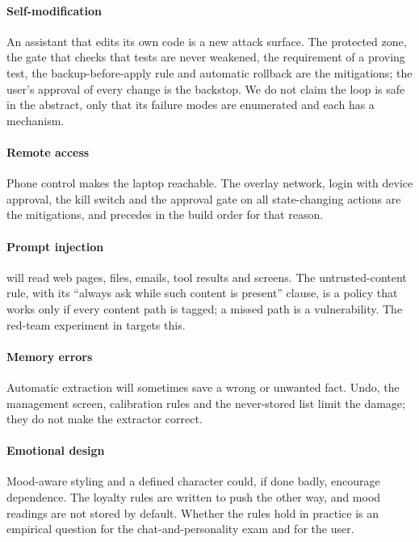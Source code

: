 \paragraph{Self-modification} An assistant that edits its own code is a new attack surface. The protected zone, the gate that checks that tests are never weakened, the requirement of a proving test, the backup-before-apply rule and automatic rollback are the mitigations; the user's approval of every change is the backstop. We do not claim the loop is safe in the abstract, only that its failure modes are enumerated and each has a mechanism.

\paragraph{Remote access} Phone control makes the laptop reachable. The overlay network, login with device approval, the kill switch and the approval gate on all state-changing actions are the mitigations, and  precedes  in the build order for that reason.

\paragraph{Prompt injection} \hivi{} will read web pages, files, emails, tool results and screens. The untrusted-content rule, with its ``always ask while such content is present'' clause, is a policy that works only if every content path is tagged; a missed path is a vulnerability. The red-team experiment in  targets this.

\paragraph{Memory errors} Automatic extraction will sometimes save a wrong or unwanted fact. Undo, the management screen, calibration rules and the never-stored list limit the damage; they do not make the extractor correct.

\paragraph{Emotional design} Mood-aware styling and a defined character could, if done badly, encourage dependence. The loyalty rules are written to push the other way, and mood readings are not stored by default. Whether the rules hold in practice is an empirical question for the chat-and-personality exam and for the user.

